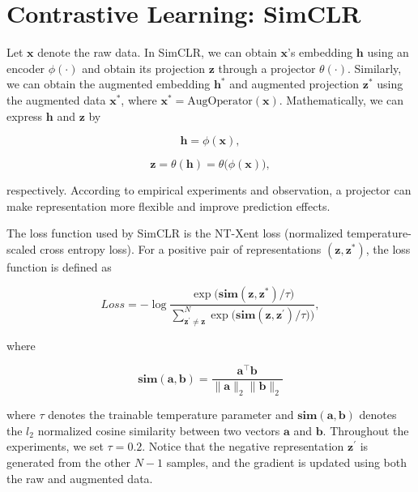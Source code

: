 

\section{Contrastive Learning: SimCLR}

Let $\mathbf{x}$ denote the raw data. In SimCLR, we can obtain $\mathbf{x}$'s embedding $\mathbf{h}$ using an encoder $\phi(\cdot)$ and obtain its projection $\mathbf{z}$ through a projector $\theta(\cdot)$. Similarly, we can obtain the augmented embedding $\mathbf{h}^{*}$ and augmented projection $\mathbf{z}^{*}$ using the augmented data $\mathbf{x}^{*}$, where $\mathbf{x}^{*} = \text{AugOperator}(\mathbf{x})$. Mathematically, we can express $\mathbf{h}$ and $\mathbf{z}$ by

\begin{equation}
\mathbf{h}=\phi(\mathbf{x}),
\end{equation}

\begin{equation}
\mathbf{z}=\theta(\mathbf{h})=\theta\Big(\phi(\mathbf{x})\Big), 
\end{equation}

respectively. According to empirical experiments and observation, a projector can make representation more flexible and improve prediction effects.

The loss function used by SimCLR is the NT-Xent loss (normalized temperature-scaled cross entropy loss). For a positive pair of representations $(\mathbf{z},\mathbf{z}^{*})$, the loss function is defined as

\begin{equation}
\mathit{Loss}=-\log\frac{\exp\big(\textbf{sim}(\mathbf{z},\mathbf{z}^{*})/\tau\big)}{\sum^{N}_{\mathbf{z}^{'}\neq\mathbf{z}}\exp\big(\textbf{sim}(\mathbf{z},\mathbf{z}^{'})/\tau)\big)},
\end{equation}

where

\begin{equation}
\textbf{sim}(\mathbf{a},\mathbf{b})=\frac{\mathbf{a}^{\intercal}\mathbf{b}}{\|\mathbf{a}\|_2\|\mathbf{b}\|_2}
\end{equation}

where $\tau$ denotes the trainable temperature parameter and $\textbf{sim}(\mathbf{a},\mathbf{b})$ denotes the $\mathit{l}_2$ normalized cosine similarity between two vectors $\mathbf{a}$ and $\mathbf{b}$. Throughout the experiments, we set $\tau = 0.2$. Notice that the negative representation $\mathbf{z}^{'}$ is generated from the other $N-1$ samples, and the gradient is updated using both the raw and augmented data.

